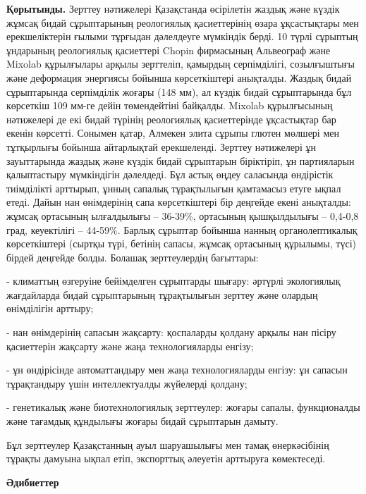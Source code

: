 \begin{multicols}{2}
{\bfseries Қорытынды.} Зерттеу нәтижелері Қазақстанда өсірілетін жаздық
және күздік жұмсақ бидай сұрыптарының реологиялық қасиеттерінің өзара
ұқсастықтары мен ерекшеліктерін ғылыми тұрғыдан дәлелдеуге мүмкіндік
берді. 10 түрлі сұрыптың ұндарының реологиялық қасиеттері Chopin
фирмасының Альвеограф және Mixolab құрылғылары арқылы зерттеліп,
қамырдың серпімділігі, созылғыштығы және деформация энергиясы бойынша
көрсеткіштері анықталды. Жаздық бидай сұрыптарында серпімділік жоғары
(148 мм), ал күздік бидай сұрыптарында бұл көрсеткіш 109 мм-ге дейін
төмендейтіні байқалды. Mixolab құрылғысының нәтижелері де екі бидай
түрінің реологиялық қасиеттерінде ұқсастықтар бар екенін көрсетті.
Сонымен қатар, Алмекен элита сұрыпы глютен мөлшері мен тұтқырлығы
бойынша айтарлықтай ерекшеленді. Зерттеу нәтижелері ұн зауыттарында
жаздық және күздік бидай сұрыптарын біріктіріп, ұн партияларын
қалыптастыру мүмкіндігін дәлелдеді. Бұл астық өңдеу саласында өндірістік
тиімділікті арттырып, ұнның сапалық тұрақтылығын қамтамасыз етуге ықпал
етеді. Дайын нан өнімдерінің сапа көрсеткіштері бір деңгейде екені
анықталды: жұмсақ ортасының ылғалдылығы -- 36-39\%, ортасының
қышқылдылығы -- 0,4-0,8 град, кеуектілігі -- 44-59\%. Барлық сұрыптар
бойынша нанның органолептикалық көрсеткіштері (сыртқы түрі, бетінің
сапасы, жұмсақ ортасының құрылымы, түсі) бірдей деңгейде болды. Болашақ
зерттеулердің бағыттары:

- климаттың өзгеруіне бейімделген сұрыптарды шығару: әртүрлі экологиялық
жағдайларда бидай сұрыптарының тұрақтылығын зерттеу және олардың
өнімділігін арттыру;

- нан өнімдерінің сапасын жақсарту: қоспаларды қолдану арқылы нан пісіру
қасиеттерін жақсарту және жаңа технологияларды енгізу;

- ұн өндірісінде автоматтандыру мен жаңа технологияларды енгізу: ұн
сапасын тұрақтандыру үшін интеллектуалды жүйелерді қолдану;

- генетикалық және биотехнологиялық зерттеулер: жоғары сапалы,
функционалды және тағамдық құндылығы жоғары бидай сұрыптарын дамыту.

Бұл зерттеулер Қазақстанның ауыл шаруашылығы мен тамақ өнеркәсібінің
тұрақты дамуына ықпал етіп, экспорттық әлеуетін арттыруға көмектеседі.
\end{multicols}

\begin{center}
{\bfseries Әдибиеттер}
\end{center}

